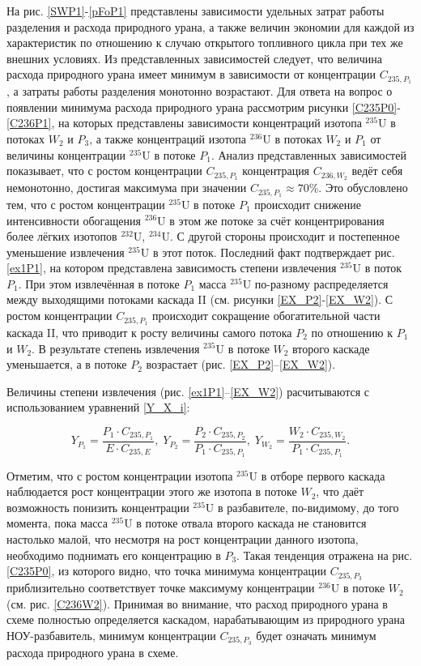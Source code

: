 На рис. \ref{SWP1}-\ref{pFoP1} представлены зависимости удельных затрат работы разделения и расхода природного урана, а также величин экономии для каждой из характеристик по отношению к случаю открытого топливного цикла при тех же внешних условиях. Из представленных зависимостей следует, что величина расхода природного урана имеет минимум в зависимости от концентрации $C_{235,{P_1}}$, а затраты работы разделения монотонно возрастают. Для ответа на вопрос о появлении минимума расхода природного урана рассмотрим рисунки \ref{C235P0}-\ref{C236P1}, на которых представлены зависимости концентраций изотопа $^{235}$U в потоках $W_2$ и $P_3$, а также концентраций изотопа $^{236}$U в потоках $W_2$ и $P_1$ от величины концентрации $^{235}$U в потоке $P_1$. Анализ представленных зависимостей показывает, что с ростом концентрации $C_{235,{P_1}}$ концентрация $C_{236,{W_2}}$ ведёт себя немонотонно, достигая максимума при значении $C_{235,{P_1}} \approx 70\%$. Это обусловлено тем, что с ростом концентрации $^{235}$U в потоке $P_1$ происходит снижение интенсивности обогащения $^{236}$U в этом же потоке за счёт концентрирования более лёгких изотопов $^{232}$U, $^{234}$U. С другой стороны происходит и постепенное уменьшение извлечения $^{235}$U в этот поток. Последний факт подтверждает рис. \ref{ex1P1}, на котором представлена зависимость степени извлечения $^{235}$U в поток $P_1$. При этом извлечённая в потоке $P_1$ масса $^{235}$U по-разному распределяется между выходящими потоками каскада II (см. рисунки \ref{EX_P2}-\ref{EX_W2}).
С ростом концентрации $C_{235,{P_1}}$ происходит сокращение обогатительной части каскада II, что приводит к росту величины самого потока $P_2$ по отношению к $P_1$ и $W_2$.
В результате степень извлечения $^{235}$U в потоке $W_2$ второго каскаде уменьшается, а в потоке $P_2$ возрастает (рис. \ref{EX_P2}--\ref{EX_W2}). 

Величины степени извлечения (рис. \ref{ex1P1}--\ref{EX_W2}) расчитываются с использованием уравнений \ref{Y_X_i}: 

\begin{equation}\label{Y_X_i}
    Y_{P_1} = \frac{P_1 \cdot C_{235,{P_1}}}{E \cdot C_{235,{E}}} ,\; 
    Y_{P_2} = \frac{P_2 \cdot C_{235,{P_2}}}{P_1 \cdot C_{235,{P_1}}} ,\; 
    Y_{W_2} = \frac{W_2 \cdot C_{235,{W_2}}}{P_1 \cdot C_{235,{P_1}}}.
\end{equation}


Отметим, что с ростом концентрации изотопа $^{235}$U в отборе первого каскада наблюдается рост концентрации этого же изотопа в потоке $W_2$, что даёт возможность понизить концентрации $^{235}$U в разбавителе, по-видимому, до того момента, пока масса $^{235}$U в потоке отвала второго каскада не становится настолько малой, что несмотря на рост концентрации данного изотопа, необходимо поднимать его концентрацию в $P_3$. Такая тенденция отражена на рис. \ref{C235P0}, из которого видно, что точка минимума концентрации $C_{235,{P_3}}$ приблизительно соответствует точке максимуму концентрации $^{236}$U в потоке $W_2$ (см. рис. \ref{C236W2}). Принимая во внимание, что расход природного урана в схеме полностью определяется каскадом, нарабатывающим из природного урана НОУ-разбавитель, минимум концентрации $C_{235,{P_3}}$ будет означать минимум расхода природного урана в схеме.

